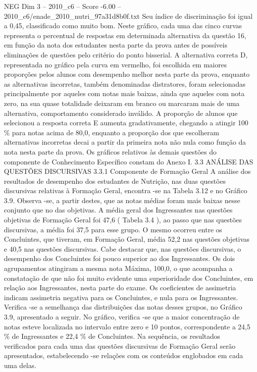 \begin{textsample}{NEG Dim 3 – 2010\_c6 – Score -6.00 – 2010\_c6/enade\_2010\_nutri\_97a31d8b0f.txt}
Seu índice de discriminação foi igual a 0,45, classificado como muito bom.
Neste gráfico, cada uma das cinco curvas representa o percentual de respostas em determinada alternativa da questão 16, em função da nota dos estudantes nesta parte da prova antes de possíveis eliminações de questões pelo critério do ponto bisserial.
A alternativa correta D, representada no gráfico pela curva em vermelho, foi escolhida em maiores proporções pelos alunos com desempenho melhor nesta parte da prova, enquanto as alternativas incorretas, também denominadas distratores, foram selecionadas principalmente por aqueles com notas mais baixas, ainda que aqueles com nota zero, na sua quase totalidade deixaram em branco ou marcaram mais de uma alternativa, comportamento considerado inválido.
A proporção de alunos que selecionou a resposta correta E aumenta gradativamente, chegando a atingir 100 \% para notas acima de 80,0, enquanto a proporção dos que escolheram alternativas incorretas decai a partir da primeira nota não nula como função da nota nesta parte da prova.
Os gráficos relativos às demais questões do componente de Conhecimento Específico constam do Anexo I. 3.3 ANÁLISE DAS QUESTÕES DISCURSIVAS 3.3.1 Componente de Formação Geral A análise dos resultados de desempenho dos estudantes de Nutrição, nas duas questões discursivas relativas à Formação Geral, encontra -se na Tabela 3.12 e no Gráfico 3.9.
Observa -se, a partir destes, que as notas médias foram mais baixas nesse conjunto que no das objetivas.
A média geral dos Ingressantes nas questões objetivas de Formação Geral foi 47,6 ( Tabela 3.4 ), ao passo que nas questões discursivas, a média foi 37,5 para esse grupo.
O mesmo ocorreu entre os Concluintes, que tiveram, em Formação Geral, média 52,2 nas questões objetivas e 40,5 nas questões discursivas.
Cabe destacar que, nas questões discursivas, o desempenho dos Concluintes foi pouco superior ao dos Ingressantes.
Os dois agrupamentos atingiram a mesma nota Máxima, 100,0, o que acompanha a constatação de que não foi muito evidente uma superioridade dos Concluintes, em relação aos Ingressantes, nesta parte do exame.
Os coeficientes de assimetria indicam assimetria negativa para os Concluintes, e nula para os Ingressantes.
Verifica -se a semelhança das distribuições das notas desses grupos, no Gráfico 3.9, apresentado a seguir.
No gráfico, verifica -se que a maior concentração de notas esteve localizada no intervalo entre zero e 10 pontos, correspondente a 24,5 \% de Ingressantes e 22,4 \% de Concluintes.
Na sequência, os resultados verificados para cada uma das questões discursivas de Formação Geral serão apresentados, estabelecendo -se relações com os conteúdos englobados em cada uma delas.

\end{textsample}
